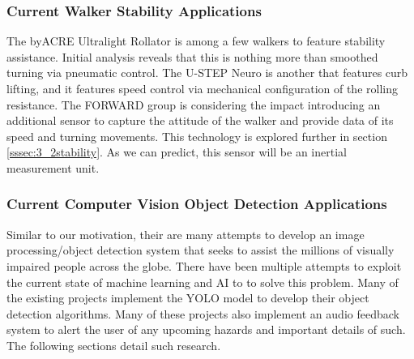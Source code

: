 \subsubsection{Current Walker Stability Applications}
\noindent The byACRE Ultralight Rollator \cite{byACRE} is among a few walkers to feature stability assistance. Initial analysis reveals that this is nothing more than smoothed turning via pneumatic control. The U-STEP Neuro \cite{ustep} is another that features curb lifting, and it features speed control via mechanical configuration of the rolling resistance. The FORWARD group is considering the impact introducing an additional sensor to capture the attitude of the walker and provide data of its speed and turning movements. This technology is explored further in section \ref{sssec:3_2stability}. As we can predict, this sensor will be an inertial measurement unit.\\

\subsubsection{Current Computer Vision Object Detection Applications}

\noindent Similar to our motivation, their are many attempts to develop an image processing/object detection system that seeks to assist the millions of visually impaired people across the globe. There have been multiple attempts to exploit the current state of machine learning and AI to to solve this problem. Many of the existing projects implement the YOLO model to develop their object detection algorithms. Many of these projects also implement an audio feedback system to alert the user of any upcoming hazards and important details of such. The following sections detail such research. \\                                                                                                                                                                                                                                                                                                                                                                                                                                                                                                                                                                                                                                                                                                                                                                                                                                                                                                                                                                                                                                                                                                                                                                                                                                                 

